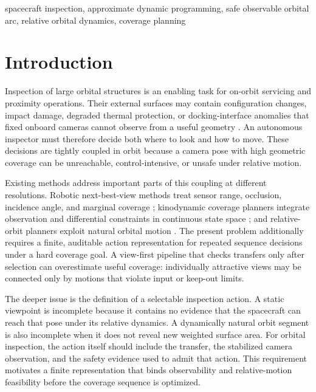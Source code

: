 \documentclass{IEEEtaes}
\theoremstyle{remark}
\theoremstyle{plain}
\begin{document}
\begin{IEEEkeywords}
spacecraft inspection, approximate dynamic programming, safe observable orbital arc, relative orbital dynamics, coverage planning
\end{IEEEkeywords}

\section{Introduction}
\label{sec:introduction}

Inspection of large orbital structures is an enabling task for on-orbit servicing and proximity operations. Their external surfaces may contain configuration changes, impact damage, degraded thermal protection, or docking-interface anomalies that fixed onboard cameras cannot observe from a useful geometry \cite{faghihi2022kinodynamic,faghihi2023multiple,apodaca2025trajectory}. An autonomous inspector must therefore decide both where to look and how to move. These decisions are tightly coupled in orbit because a camera pose with high geometric coverage can be unreachable, control-intensive, or unsafe under relative motion.

Existing methods address important parts of this coupling at different resolutions. Robotic next-best-view methods treat sensor range, occlusion, incidence angle, and marginal coverage \cite{scott2003view}; kinodynamic coverage planners integrate observation and differential constraints in continuous state space \cite{faghihi2022kinodynamic,faghihi2023multiple}; and relative-orbit planners exploit natural orbital motion \cite{hou2024relative,deka2023astrodynamics}. The present problem additionally requires a finite, auditable action representation for repeated sequence decisions under a hard coverage goal. A view-first pipeline that checks transfers only after selection can overestimate useful coverage: individually attractive views may be connected only by motions that violate input or keep-out limits.

The deeper issue is the definition of a selectable inspection action. A static viewpoint is incomplete because it contains no evidence that the spacecraft can reach that pose under its relative dynamics. A dynamically natural orbit segment is also incomplete when it does not reveal new weighted surface area. For orbital inspection, the action itself should include the transfer, the stabilized camera observation, and the safety evidence used to admit that action. This requirement motivates a finite representation that binds observability and relative-motion feasibility before the coverage sequence is optimized.
\end{document}
